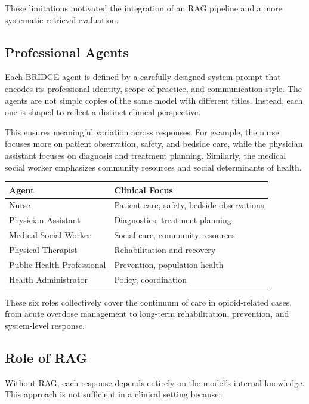 \documentclass[12pt]{article}
\begin{document}
These limitations motivated the integration of an RAG pipeline and a more systematic retrieval evaluation.

\subsection{Professional Agents}

Each BRIDGE agent is defined by a carefully designed system prompt that encodes its professional identity, scope of practice, and communication style. The agents are not simple copies of the same model with different titles. Instead, each one is shaped to reflect a distinct clinical perspective.

This ensures meaningful variation across responses. For example, the nurse focuses more on patient observation, safety, and bedside care, while the physician assistant focuses on diagnosis and treatment planning. Similarly, the medical social worker emphasizes community resources and social determinants of health.

\begin{center}
\begin{tabular}{>{\raggedright\arraybackslash}p{2.2in} >{\raggedright\arraybackslash}p{3.2in}}
\toprule
\textbf{Agent} & \textbf{Clinical Focus} \\
\midrule
Nurse & Patient care, safety, bedside observations \\
Physician Assistant & Diagnostics, treatment planning \\
Medical Social Worker & Social care, community resources \\
Physical Therapist & Rehabilitation and recovery \\
Public Health Professional & Prevention, population health \\
Health Administrator & Policy, coordination \\
\bottomrule
\end{tabular}
\end{center}

These six roles collectively cover the continuum of care in opioid-related cases, from acute overdose management to long-term rehabilitation, prevention, and system-level response.

\subsection{Role of RAG}

Without RAG, each response depends entirely on the model's internal knowledge. This approach is not sufficient in a clinical setting because:
\end{document}
